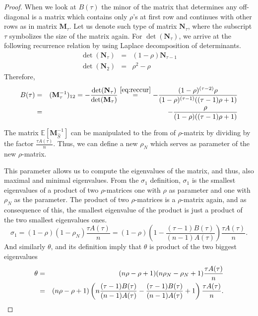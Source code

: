 \documentclass[11pt]{article}
\begin{document}
\begin{proof}
		When we look at $B(\tau)$ the minor of the matrix that determines any off-diagonal is a matrix which contains only $\rho$'s at first row and continues with other rows as in matrix $\mathbf{M}_\tau$. Let us denote such type of matrix $\mathbf{N}_{\tau}$, where the subscript $\tau$ symbolizes the size of the matrix again. For $\det(\mathbf{N}_{\tau})$, we arrive at the following recurrence relation by using Laplace decomposition of determinants.
		\begin{eqnarray} \label{eq:reccur}
			\det(\mathbf{N}_{\tau})& =& (1-\rho)\mathbf{N}_{\tau-1} \\
			\det(\mathbf{N}_{2})& = & \rho^2-\rho
		\end{eqnarray}
		Therefore,
		\begin{eqnarray}
			B(\tau)&=&(\mathbf{M}_{\tau}^{-1})_{12}=-\frac{\det(\mathbf{N}_{\tau})}{\det(\mathbf{M}_{\tau})}\stackrel{\eqref{eq:reccur}}=-\frac{(1-\rho)^{(\tau-2)}\rho}{(1-\rho)^{(\tau-1)}((\tau-1)\rho+1)} \notag \\&= &-\frac{\rho}{(1-\rho)((\tau-1)\rho+1)} 
		\end{eqnarray}
		
		The matrix $\mathbb{E}[\mathbf{M}_{\hat{S}}^{-1}]$ can be manipulated to the from of $\rho$-matrix by dividing by the factor $\frac{\tau A(\tau)}{n}$. Thus, we can define a new $\rho_N$ which serves as parameter of the new $\rho$-matrix. 
		
		This parameter allows us to compute the eigenvalues of the matrix, and thus, also maximal and minimal eigenvalues. From the $\sigma_1$ definition, $\sigma_1$  is the smallest eigenvalues of a product of two $\rho$-matrices one with $\rho$ as parameter and one with $\rho_N$ as the parameter. The product of two $\rho$-matrices is a $\rho$-matrix again, and as consequence of this, the smallest eigenvalue of the product is just a product of the two smallest eigenvalues ones.
		\begin{equation}
			\sigma_1=(1-\rho)(1-\rho_N)\frac{\tau A(\tau)}{n}=(1-\rho)\left(1-\frac{(\tau-1)B(\tau)}{(n-1)A(\tau)}\right)\frac{\tau A(\tau)}{n}.
		\end{equation}
		And similarly $ \theta$, and its definition imply that $ \theta$ is product of the two biggest eigenvalues
		\begin{eqnarray}
			 \theta&=&(n\rho-\rho+1)(n\rho_N-\rho_N+1)\frac{\tau A(\tau)}{n} \notag\\&=&(n\rho-\rho+1)\left(n\frac{(\tau-1)B(\tau)}{(n-1)A(\tau)}-\frac{(\tau-1)B(\tau)}{(n-1)A(\tau)}+1\right)\frac{\tau A(\tau)}{n}	.
		\end{eqnarray}	
	\end{proof}
	
\end{document}

